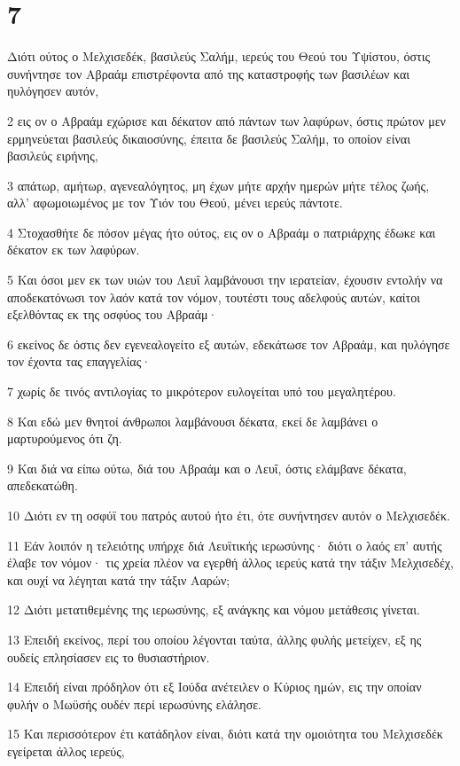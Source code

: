 \chapter{7}

\par Διότι ούτος ο Μελχισεδέκ, βασιλεύς Σαλήμ, ιερεύς του Θεού του Υψίστου, όστις συνήντησε τον Αβραάμ επιστρέφοντα από της καταστροφής των βασιλέων και ηυλόγησεν αυτόν,
\par 2 εις ον ο Αβραάμ εχώρισε και δέκατον από πάντων των λαφύρων, όστις πρώτον μεν ερμηνεύεται βασιλεύς δικαιοσύνης, έπειτα δε βασιλεύς Σαλήμ, το οποίον είναι βασιλεύς ειρήνης,
\par 3 απάτωρ, αμήτωρ, αγενεαλόγητος, μη έχων μήτε αρχήν ημερών μήτε τέλος ζωής, αλλ' αφωμοιωμένος με τον Υιόν του Θεού, μένει ιερεύς πάντοτε.
\par 4 Στοχασθήτε δε πόσον μέγας ήτο ούτος, εις ον ο Αβραάμ ο πατριάρχης έδωκε και δέκατον εκ των λαφύρων.
\par 5 Και όσοι μεν εκ των υιών του Λευΐ λαμβάνουσι την ιερατείαν, έχουσιν εντολήν να αποδεκατόνωσι τον λαόν κατά τον νόμον, τουτέστι τους αδελφούς αυτών, καίτοι εξελθόντας εκ της οσφύος του Αβραάμ·
\par 6 εκείνος δε όστις δεν εγενεαλογείτο εξ αυτών, εδεκάτωσε τον Αβραάμ, και ηυλόγησε τον έχοντα τας επαγγελίας·
\par 7 χωρίς δε τινός αντιλογίας το μικρότερον ευλογείται υπό του μεγαλητέρου.
\par 8 Και εδώ μεν θνητοί άνθρωποι λαμβάνουσι δέκατα, εκεί δε λαμβάνει ο μαρτυρούμενος ότι ζη.
\par 9 Και διά να είπω ούτω, διά του Αβραάμ και ο Λευΐ, όστις ελάμβανε δέκατα, απεδεκατώθη.
\par 10 Διότι εν τη οσφύϊ του πατρός αυτού ήτο έτι, ότε συνήντησεν αυτόν ο Μελχισεδέκ.
\par 11 Εάν λοιπόν η τελειότης υπήρχε διά Λευϊτικής ιερωσύνης· διότι ο λαός επ' αυτής έλαβε τον νόμον· τις χρεία πλέον να εγερθή άλλος ιερεύς κατά την τάξιν Μελχισεδέχ, και ουχί να λέγηται κατά την τάξιν Ααρών;
\par 12 Διότι μετατιθεμένης της ιερωσύνης, εξ ανάγκης και νόμου μετάθεσις γίνεται.
\par 13 Επειδή εκείνος, περί του οποίου λέγονται ταύτα, άλλης φυλής μετείχεν, εξ ης ουδείς επλησίασεν εις το θυσιαστήριον.
\par 14 Επειδή είναι πρόδηλον ότι εξ Ιούδα ανέτειλεν ο Κύριος ημών, εις την οποίαν φυλήν ο Μωϋσής ουδέν περί ιερωσύνης ελάλησε.
\par 15 Και περισσότερον έτι κατάδηλον είναι, διότι κατά την ομοιότητα του Μελχισεδέκ εγείρεται άλλος ιερεύς,
